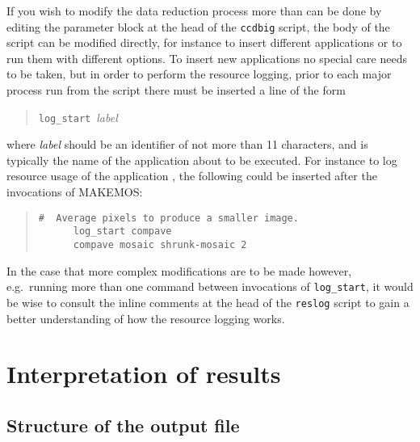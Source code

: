 If you wish to modify the data reduction process more
than can be done by editing the parameter block
at the head of the {\tt ccdbig} script,
the body of the script can be modified directly,
for instance to insert different applications or 
to run them with different options.
To insert new applications no special
care needs to be taken, but in order to perform the 
resource logging, 
prior to each major process run from the script
there must be inserted a line of the form
\begin{quote}
{\tt log\_start}\ {\it label}
\end{quote}
where {\it label} should be an identifier of not more
than 11 characters, 
and is typically the name of the application about to be executed.
For instance to log resource usage of the {\KAPPAref}
application ,
the following could be inserted
after the invocations of MAKEMOS:
\begin{quote}
\begin{verbatim}
#  Average pixels to produce a smaller image.
      log_start compave
      compave mosaic shrunk-mosaic 2
\end{verbatim}
\end{quote}

In the case that more complex modifications are to be
made however, e.g.\ running more than one command 
between invocations of {\tt log\_start}, 
it would be wise to consult the inline comments 
at the head of the {\tt reslog}
script to gain a better understanding of how the
resource logging works.



\section{Interpretation of results}

\subsection{Structure of the output file}

